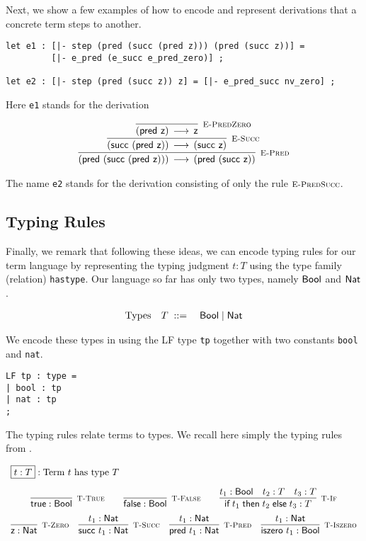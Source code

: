 Next,  we show a few examples of  how to encode and represent derivations that a
concrete term steps to another.

\begin{lstlisting}
let e1 : [|- step (pred (succ (pred z))) (pred (succ z))] =
         [|- e_pred (e_succ e_pred_zero)] ;

let e2 : [|- step (pred (succ z)) z] = [|- e_pred_succ nv_zero] ;
\end{lstlisting}

Here \lstinline!e1! stands for the derivation

\[
\begin{array}{c}
\infer[\EPred]{(\tmpred {(\tmsucc {(\tmpred {\tmzero})})}) \Steps (\tmpred {(\tmsucc {\tmzero})})}
{\infer[\ESucc]{(\tmsucc {(\tmpred {\tmzero})}) \Steps (\tmsucc {\tmzero} )}
 {\infer[\EPredZ]{(\tmpred {\tmzero}) \Steps \tmzero}{}}
}
\end{array}
\]

The name \lstinline!e2! stands for the derivation consisting of only
the rule $\textsc{\footnotesize E-PredSucc}$.

\subsection{Typing Rules}

Finally, we remark that following these ideas, we can encode typing rules for
our term language by representing the typing judgment $t : T$ using the type
family (relation) \lstinline!hastype!. Our language so far has only two types,
namely $\textsf{Bool}$ and $\textsf{Nat}$.

\[
\begin{array}{lll}
\mbox{Types} & T \;\mathrel{::=}\; & \textsf{Bool} \mid \textsf{Nat}
\end{array}
\]

We encode these types in \beluga using the LF type \lstinline!tp! together with
two constants \lstinline!bool! and \lstinline!nat!.

\begin{lstlisting}
LF tp : type =
| bool : tp
| nat : tp
;
\end{lstlisting}

The typing rules relate terms to types. We recall here simply the typing rules from \cite{TAPL}.

\[
\begin{array}{c}
\multicolumn{1}{l}{\fbox{$t \hastype T$}: \mbox{Term $t$ has type $T$}}\\[1em]
  \infer[\TTrue]{\tmtrue \hastype \Bool}{} \qquad
  \infer[\TFalse]{\tmfalse \hastype \Bool}{} \qquad
  \infer[\TIf]{\tmif{t_1}{t_2}{t_3} \hastype T}{t_1 \hastype \Bool & t_2 \hastype T & t_3 \hastype T}
\\[0.5em]
  \infer[\TZero]{\tmzero \hastype \Nat}{}\quad
  \infer[\TSucc]{\tmsucc t_1 \hastype \Nat}{t_1 \hastype \Nat} \quad
  \infer[\TPred]{\tmpred t_1 \hastype \Nat}{t_1 \hastype \Nat} \quad
  \infer[\TIsZero]{\tmiszero t_1 \hastype \Bool}{t_1 \hastype \Nat}
\\
\end{array}
\]

